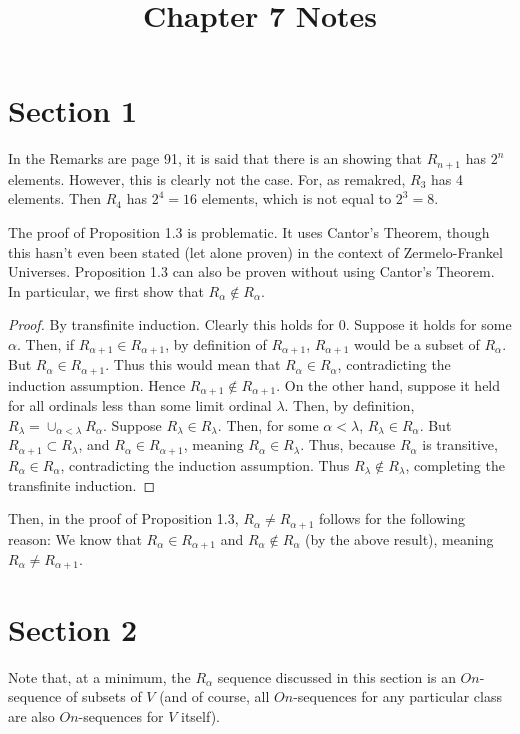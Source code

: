 \documentclass{article}
\title{Chapter 7 Notes}
\theoremstyle{definition}
\begin{document}
\date{}
\maketitle

\section*{Section 1}
In the Remarks are page 91, it is said that there is an  showing that $R_{n+1}$ has $2^n$ elements. However, this is clearly 
not the case. For, as remakred, $R_3$ has 4 elements. Then $R_4$ has $2^4=16$ elements, which is not equal to $2^3=8$. 

The proof of Proposition 1.3 is problematic. It uses Cantor's Theorem, though this hasn't even been stated (let alone proven) in the context of 
Zermelo-Frankel Universes. Proposition 1.3 can also be proven without using Cantor's Theorem. In particular, we first show that $R_\alpha\not\in R_\alpha$.

\begin{proof}
By transfinite induction. Clearly this holds for 0. Suppose it holds for some $\alpha$. Then, if $R_{\alpha+1}\in R_{\alpha+1}$, by definition 
of $R_{\alpha+1}$, $R_{\alpha+1}$ would be a subset of $R_\alpha$. But $R_\alpha\in R_{\alpha+1}$. Thus this would mean that 
$R_\alpha\in R_\alpha$, contradicting the induction assumption. Hence $R_{\alpha+1}\notin R_{\alpha+1}$. On the other hand, suppose it held for all 
ordinals less than some limit ordinal $\lambda$. Then, by definition, $R_\lambda=\cup_{\alpha<\lambda}R_\alpha$. Suppose 
$R_\lambda\in R_\lambda$. Then, for some $\alpha<\lambda$, $R_\lambda\in R_\alpha$. But $R_{\alpha+1}\subset R_\lambda$, and 
$R_\alpha\in R_{\alpha+1}$, meaning $R_\alpha\in R_\lambda$. Thus, because $R_\alpha$ is transitive, $R_\alpha\in R_\alpha$, contradicting the 
induction assumption. Thus $R_\lambda\notin R_\lambda$, completing the transfinite induction.
\end{proof}

Then, in the proof of Proposition 1.3, $R_\alpha\ne R_{\alpha+1}$ follows for the following reason: We know that 
$R_\alpha\in R_{\alpha+1}$ and $R_\alpha\notin R_\alpha$ (by the above result), meaning 
$R_\alpha\ne R_{\alpha+1}$.

\section*{Section 2}
Note that, at a minimum, the $R_\alpha$ sequence discussed in this section is an $On$-sequence of subsets of $V$ (and of course, all $On$-sequences for any 
particular class are also $On$-sequences for $V$ itself).
\end{document}
